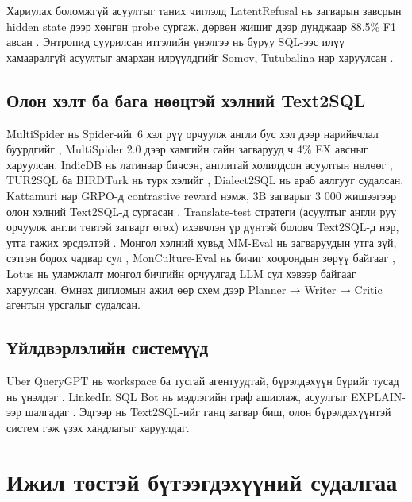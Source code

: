 Хариулах боломжгүй асуултыг таних чиглэлд LatentRefusal нь загварын завсрын hidden state дээр хөнгөн probe сургаж, дөрвөн
жишиг дээр дунджаар 88.5\% F1 авсан \cite{ren_2026_latentrefusal}. Энтропид суурилсан итгэлийн үнэлгээ нь буруу SQL-ээс
илүү хамааралгүй асуултыг амархан илрүүлдгийг Somov, Tutubalina нар харуулсан \cite{somov_2025_confidence_text2sql}.

\subsection{Олон хэлт ба бага нөөцтэй хэлний Text2SQL}

MultiSpider нь Spider-ийг 6 хэл рүү орчуулж англи бус хэл дээр нарийвчлал буурдгийг \cite{dou_2023_multispider},
MultiSpider 2.0 дээр хамгийн сайн загварууд ч 4\% EX авсныг \cite{pham_2026_multispider2} харуулсан. IndicDB нь латинаар
бичсэн, англитай холилдсон асуултын нөлөөг \cite{dawar_2026_indicdb}, TUR2SQL ба BIRDTurk нь турк хэлийг
\cite{kanburoglu_2023_tur2sql, aktas_2026_birdturk}, Dialect2SQL нь араб аялгууг \cite{chafik_2025_dialect2sql} судалсан.
Kattamuri нар GRPO-д contrastive reward нэмж, 3B загварыг 3 000 жишээгээр олон хэлний Text2SQL-д сургасан
\cite{kattamuri_2025_contrastive_grpo}. Translate-test стратеги (асуултыг англи руу орчуулж англи төвтэй загварт өгөх) ихэвчлэн үр дүнтэй
\cite{etxaniz_2024_self_translate, huang_2023_xlt} боловч Text2SQL-д нэр, утга гажих эрсдэлтэй \cite{dawar_2026_indicdb}.
Монгол хэлний хувьд MM-Eval нь загваруудын утга зүй, сэтгэн бодох чадвар сул \cite{zhang_2024_mm_eval}, MonCulture-Eval нь
бичиг хоорондын зөрүү байгааг \cite{minggad_2026_monculture_eval}, Lotus нь уламжлалт монгол бичгийн орчуулгад LLM сул
хэвээр байгааг \cite{lin_2025_lotus} харуулсан. Өмнөх дипломын ажил
\cite{text2sql_thesis_2026} өөр схем дээр Planner → Writer → Critic агентын урсгалыг судалсан.

\subsection{Үйлдвэрлэлийн системүүд}

Uber QueryGPT нь workspace ба тусгай агентуудтай, бүрэлдэхүүн бүрийг тусад нь үнэлдэг \cite{uber_querygpt}. LinkedIn SQL
Bot нь мэдлэгийн граф ашиглаж, асуулгыг EXPLAIN-ээр шалгадаг \cite{linkedin_sqlbot}. Эдгээр нь Text2SQL-ийг ганц загвар
биш, олон бүрэлдэхүүнтэй систем гэж үзэх хандлагыг харуулдаг.

\section{Ижил төстэй бүтээгдэхүүний судалгаа}
\label{sec:products}

